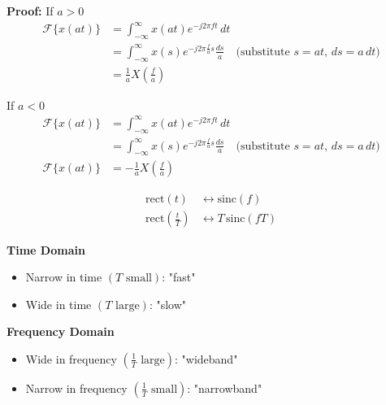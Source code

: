 \begin{derivation}
    \textbf{Proof:}
    If $a>0$
    \begin{align*}
        \mathcal{F}\{x(at)\} &= \int_{-\infty}^{\infty} x(at) e^{-j 2 \pi f t} \, dt \\
        &= \int_{-\infty}^{\infty} x(s) e^{-j 2 \pi \frac{f}{a} s} \frac{ds}{a} \quad \text{(substitute } s = at, \, ds = a \, dt\text{)} \\
        &= \frac{1}{a} X\left(\frac{f}{a}\right)
    \end{align*}
    
    If $a<0$
    \begin{align*}
        \mathcal{F}\{x(at)\} &= \int_{-\infty}^{\infty} x(at) e^{-j 2 \pi f t} \, dt \\
        &= \int_{-\infty}^{\infty} x(s) e^{-j 2 \pi \frac{f}{a} s} \frac{ds}{a} \quad \text{(substitute } s = at, \, ds = a \, dt\text{)} \\
        \mathcal{F}\{x(at)\} &= -\frac{1}{a} X\left(\frac{f}{a}\right)
    \end{align*}
\end{derivation}

\begin{example}
    \begin{align*}
        \text{rect}(t) &\leftrightarrow \text{sinc}(f) \\
        \text{rect}\left(\frac{t}{T}\right) &\leftrightarrow T \, \text{sinc}(f T)
    \end{align*}

    \begin{center}
        \begin{multicols}{2}
            \textbf{Time Domain}
            \begin{itemize}
                \item Narrow in time $(T \text{ small})$: "fast"
                \item Wide in time $(T \text{ large})$: "slow"
            \end{itemize}
    
            \columnbreak
    
            \textbf{Frequency Domain}
            \begin{itemize}
                \item Wide in frequency $\left(\frac{1}{T} \text{ large}\right)$: "wideband"
                \item Narrow in frequency $\left(\frac{1}{T} \text{ small}\right)$: "narrowband"
            \end{itemize}
        \end{multicols}
    \end{center}
\end{example}

